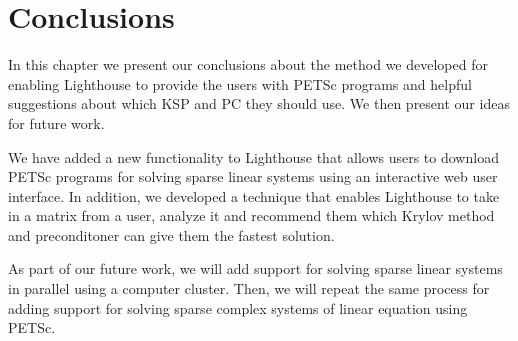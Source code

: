 \chapter{Conclusions}
\label{conclusionchap}

In this chapter we present our conclusions about the method we developed for enabling Lighthouse to provide the users with PETSc programs and helpful suggestions about which KSP and PC they should use. We then present our ideas for future work.

We have added a new functionality to Lighthouse that allows users to download PETSc programs for solving sparse linear systems using an interactive web user interface. In addition, we developed a technique that enables Lighthouse to take in a matrix from a user, analyze it and recommend them which Krylov method and preconditoner can give them the fastest solution.

As part of our future work, we will add support for solving sparse linear systems in parallel using a computer cluster. Then, we will repeat the same process for adding support for solving sparse complex systems of linear equation using PETSc.